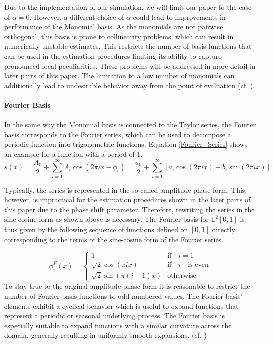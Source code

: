 \documentclass[11pt,twoside,a4paper]{article}
\begin{document}
	Due to the implementation of our simulation, we will limit our paper to the case of $\alpha = 0$. However, a different choice of $\alpha$ could lead to improvements in performance of the Monomial basis.
	As the monomials are not pairwise orthogonal, this basis is prone to collinearity problems, which can result in numerically unstable estimates. This restricts the number of basis functions that can be used in the estimation procedures limiting its ability to capture pronounced local peculiarities. These problems will be addressed in more detail in later parts of this paper. The limitation to a low number of monomials can additionally lead to undesirable behavior away from the point of evaluation (cf. \cite{ramsay_functional_2005}).
	\vspace{-0.2cm}
	
	\paragraph{Fourier Basis}
	In the same way the Monomial basis is connected to the Taylor series, the Fourier basis corresponds to the Fourier series, which can be used to decompose a periodic function into trigonometric functions. Equation \ref{Fourier_Series} shows an example for a function with a period of 1.
	\begin{equation}\label{Fourier_Series}
		s(x) = \frac{A_0}{2} + \sum_{i = 1}^{\infty} A_i \cos(2\pi i x - \phi_i) = \frac{a_0}{2} + \sum_{i = 1}^{\infty}\left[a_i \cos(2\pi i x) + b_i \sin(2\pi i x)\right]
	\end{equation}
	
	Typically, the series is represented in the so called amplitude-phase form. This, however, is impractical for the estimation procedures shown in the later parts of this paper due to the phase shift parameter. Therefore, rewriting the series in the sine-cosine form as shown above is necessary.	
	The Fourier basis for $\mathbb{L}^2[0,1]$ is thus given by the following sequence of functions defined on $[0,1]$ directly corresponding to the terms of the sine-cosine form of the Fourier series.
	
	\begin{equation}
		\phi_{i}^{F}(x) = 
		\begin{cases}
			1 & \text{if} \quad i = 1\\
			\sqrt{2} \cos(\pi i x) & \text{if} \quad i \quad \text{is even} \\
			\sqrt{2} \sin(\pi (i-1)x) & \text{otherwise}
		\end{cases}
	\end{equation}
	To stay true to the original amplitude-phase form it is reasonable to restrict the number of Fourier basis functions to odd numbered values. The Fourier basis' elements exhibit a cyclical behavior which is useful to expand functions that represent a periodic or seasonal underlying process. The Fourier basis is especially suitable to expand functions with a similar curvature across the domain, generally resulting in uniformly smooth expansions. (cf. \cite{ramsay_functional_2005})
	\vspace{-0.2cm}
\end{document}
